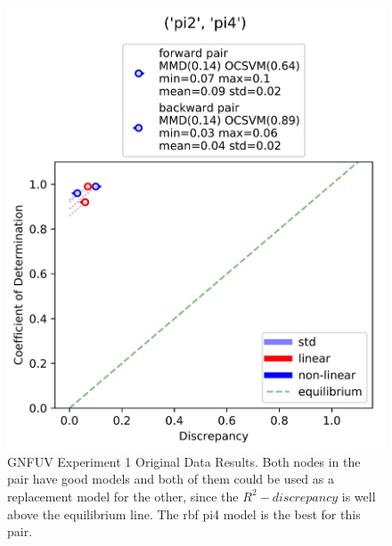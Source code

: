 \documentclass{mpaper}
\begin{document}
\begin{figure}
    \begin{center}
        \includegraphics[scale = 0.085]{experiment_1.jpg}
    \end{center}
    \caption{GNFUV Experiment 1 Original Data Results. Both nodes in the pair have good models and both of them could be used as a replacement model for the other, since the $R^2 - discrepancy$ is well above the equilibrium line. The rbf pi4 model is the best for this pair.}
    \label{fig:gnfuv_exp1}
\end{figure}
\end{document}
